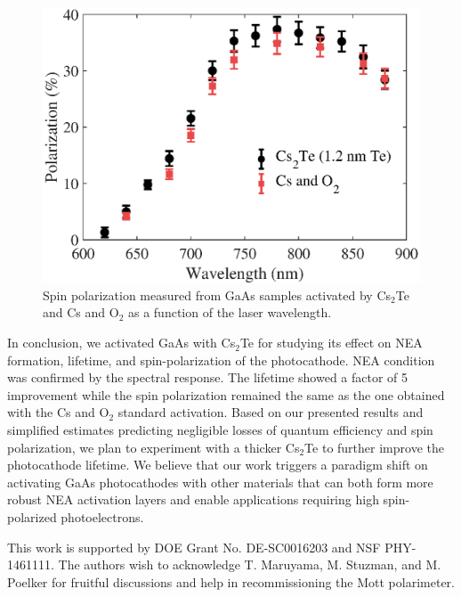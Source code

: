 \begin{figure}
    \centering
    \includegraphics[scale=0.53]{figs/CsTe/pol.eps}
    \caption{Spin polarization measured from GaAs samples activated by Cs$_2$Te and Cs and O$_2$ as a function of the laser wavelength. %
    }
    \label{pol}
\end{figure}

In conclusion, we activated GaAs with Cs$_2$Te for studying its effect on NEA formation, lifetime, and spin-polarization of the photocathode. NEA condition was confirmed by the spectral response. The lifetime showed a factor of 5 improvement while the spin polarization remained the same as the one obtained with the Cs and O$_2$ standard activation.
Based on our presented results and simplified estimates predicting negligible losses of quantum efficiency and spin polarization, we plan to experiment with a thicker Cs$_2$Te to further improve the photocathode lifetime.
We believe that our work triggers a paradigm shift on activating GaAs photocathodes with other materials that can both form more robust NEA activation layers and enable applications requiring high spin-polarized photoelectrons.

This work is supported by DOE Grant No. DE-SC0016203 and NSF PHY-1461111. The authors wish to acknowledge T. Maruyama, M. Stuzman, and M. Poelker for fruitful discussions and help in recommissioning the Mott polarimeter.
